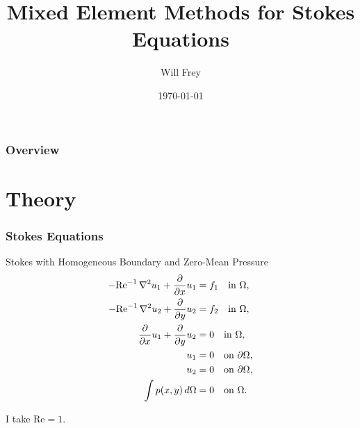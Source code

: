 \documentclass{beamer}
\title[Stokes Flow]{Mixed Element Methods for Stokes Equations} %
\author{Will Frey} %
\institute[VA Tech] %
{
    Virginia Tech \\ %
}
\date{\today} %
\begin{document}
\begin{frame}
    \titlepage%
\end{frame}

\begin{frame}
    \frametitle{Overview} %
    \tableofcontents %
\end{frame}


\section{Theory} %

\begin{frame}
    \frametitle{Stokes Equations}
    \begin{block}{Stokes with Homogeneous Boundary and Zero-Mean Pressure}
        \begin{equation}
            \begin{split}
                -\text{Re}^{-1}\,\nabla^2 u_1 + \frac{\partial}{\partial x} u_1 &= f_1 \quad
                    \text{in } \Omega, \\
                -\text{Re}^{-1}\,\nabla^2 u_2 + \frac{\partial}{\partial y} u_2 &= f_2 \quad
                    \text{in } \Omega, \\
                \frac{\partial}{\partial x} u_1 + \frac{\partial}{\partial y} u_2 &= 0 \quad \text{in }
                    \Omega, \\
                u_1 &= 0 \quad \text{on } \partial \Omega, \\
                u_2 &= 0 \quad \text{on } \partial \Omega, \\
                \int p(x,y) \,d\Omega &= 0 \quad \text{on } \Omega.
            \end{split}
        \end{equation}
    \end{block}

    I take $\text{Re} = 1$.
\end{frame}
\end{document}
